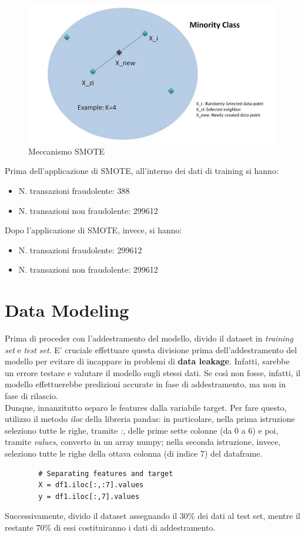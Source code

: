 \documentclass[]{article}
\begin{document}
            \begin{figure}[H]
                \centering
                \includegraphics[width=.45\textwidth]{img/SMOTE.png}
                \caption[short]{Meccanismo SMOTE}
            \end{figure}
            Prima dell'applicazione di SMOTE, all'interno dei dati di training si hanno:
            \begin{itemize}
                \item N. transazioni fraudolente: 388
                \item N. transazioni non fraudolente: 299612
            \end{itemize}
            Dopo l'applicazione di SMOTE, invece, si hanno:
            \begin{itemize}
                \item N. transazioni fraudolente: 299612
                \item N. transazioni non fraudolente: 299612
            \end{itemize}

\section{Data Modeling}
    Prima di proceder con l'addestramento del modello, divido il dataset in \textit{training set} e \textit{test set}. E' cruciale effettuare questa divisione prima dell'addestramento del modello per evitare di incappare in problemi di \textbf{data leakage}. Infatti, sarebbe un errore testare e valutare il modello sugli stessi dati. Se così non fosse, infatti, il modello effettuerebbe predizioni accurate in fase di addestramento, ma non in fase di rilascio.\\
    Dunque, innanzitutto separo le features dalla variabile target. Per fare questo, utilizzo il metodo \textit{iloc} della libreria pandas: in particolare, nella prima istruzione seleziono tutte le righe, tramite \textit{:}, delle prime sette colonne (da 0 a 6) e poi, tramite \textit{values}, converto in un array numpy; nella seconda istruzione, invece, seleziono tutte le righe della ottava colonna (di indice 7)  del dataframe.
    \begin{verbatim}
        # Separating features and target
        X = df1.iloc[:,:7].values
        y = df1.iloc[:,7].values
    \end{verbatim}
    Successivamente, divido il dataset assegnando il 30\% dei dati al test set, mentre il restante 70\% di essi costituiranno i dati di addestramento.
\end{document}
